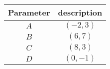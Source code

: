 \begin{tabular}[12pt]{ |c| c|}
    \hline
    \textbf{Parameter} & \textbf{description}\\ 
    \hline
	$A$ & $(-2,3)$ \\
    \hline 
	$B$ & $(6,7)$ \\
    \hline
	$C$ & $(8,3)$ \\
    \hline   
	$D$ & $(0,-1)$ \\
    \hline
    \end{tabular}

